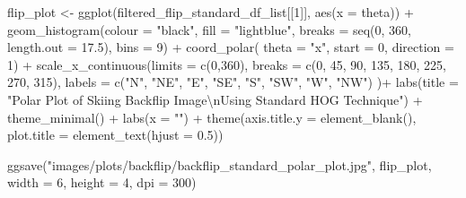 \documentclass[
  letterpaper,
  DIV=11,
  numbers=noendperiod]{scrreprt}
\newenvironment{Shaded}{\begin{snugshade}}{\end{snugshade}}
\newcommand{\AttributeTok}[1]{\textcolor[rgb]{0.40,0.45,0.13}{#1}}
\newcommand{\DecValTok}[1]{\textcolor[rgb]{0.68,0.00,0.00}{#1}}
\newcommand{\FloatTok}[1]{\textcolor[rgb]{0.68,0.00,0.00}{#1}}
\newcommand{\FunctionTok}[1]{\textcolor[rgb]{0.28,0.35,0.67}{#1}}
\newcommand{\NormalTok}[1]{\textcolor[rgb]{0.00,0.23,0.31}{#1}}
\newcommand{\OtherTok}[1]{\textcolor[rgb]{0.00,0.23,0.31}{#1}}
\newcommand{\SpecialCharTok}[1]{\textcolor[rgb]{0.37,0.37,0.37}{#1}}
\newcommand{\StringTok}[1]{\textcolor[rgb]{0.13,0.47,0.30}{#1}}
\begin{document}
\begin{Shaded}
\begin{Highlighting}[]
\NormalTok{flip\_plot }\OtherTok{\textless{}{-}}
  \FunctionTok{ggplot}\NormalTok{(filtered\_flip\_standard\_df\_list[[}\DecValTok{1}\NormalTok{]],}
         \FunctionTok{aes}\NormalTok{(}\AttributeTok{x =}\NormalTok{ theta)) }\SpecialCharTok{+}
  \FunctionTok{geom\_histogram}\NormalTok{(}\AttributeTok{colour =} \StringTok{"black"}\NormalTok{,}
                 \AttributeTok{fill =} \StringTok{"lightblue"}\NormalTok{,}
                 \AttributeTok{breaks =} \FunctionTok{seq}\NormalTok{(}\DecValTok{0}\NormalTok{, }\DecValTok{360}\NormalTok{, }\AttributeTok{length.out =} \FloatTok{17.5}\NormalTok{),}
                 \AttributeTok{bins =} \DecValTok{9}\NormalTok{) }\SpecialCharTok{+}
  \FunctionTok{coord\_polar}\NormalTok{(}
    \AttributeTok{theta =} \StringTok{"x"}\NormalTok{,}
    \AttributeTok{start =} \DecValTok{0}\NormalTok{,}
    \AttributeTok{direction =} \DecValTok{1}\NormalTok{) }\SpecialCharTok{+}
  \FunctionTok{scale\_x\_continuous}\NormalTok{(}\AttributeTok{limits =} \FunctionTok{c}\NormalTok{(}\DecValTok{0}\NormalTok{,}\DecValTok{360}\NormalTok{),}
    \AttributeTok{breaks =} \FunctionTok{c}\NormalTok{(}\DecValTok{0}\NormalTok{, }\DecValTok{45}\NormalTok{, }\DecValTok{90}\NormalTok{, }\DecValTok{135}\NormalTok{, }\DecValTok{180}\NormalTok{, }\DecValTok{225}\NormalTok{, }\DecValTok{270}\NormalTok{, }\DecValTok{315}\NormalTok{),}
    \AttributeTok{labels =} \FunctionTok{c}\NormalTok{(}\StringTok{"N"}\NormalTok{, }\StringTok{"NE"}\NormalTok{, }\StringTok{"E"}\NormalTok{, }\StringTok{"SE"}\NormalTok{, }\StringTok{"S"}\NormalTok{, }\StringTok{"SW"}\NormalTok{, }\StringTok{"W"}\NormalTok{, }\StringTok{"NW"}\NormalTok{)}
\NormalTok{  )}\SpecialCharTok{+}
  \FunctionTok{labs}\NormalTok{(}\AttributeTok{title =} \StringTok{"Polar Plot of Skiing Backflip Image}\SpecialCharTok{\textbackslash{}n}\StringTok{Using Standard HOG Technique"}\NormalTok{) }\SpecialCharTok{+}
  \FunctionTok{theme\_minimal}\NormalTok{() }\SpecialCharTok{+}
  \FunctionTok{labs}\NormalTok{(}\AttributeTok{x =} \StringTok{""}\NormalTok{) }\SpecialCharTok{+}
  \FunctionTok{theme}\NormalTok{(}\AttributeTok{axis.title.y =} \FunctionTok{element\_blank}\NormalTok{(),}
        \AttributeTok{plot.title =} \FunctionTok{element\_text}\NormalTok{(}\AttributeTok{hjust =} \FloatTok{0.5}\NormalTok{))}

\FunctionTok{ggsave}\NormalTok{(}\StringTok{"images/plots/backflip/backflip\_standard\_polar\_plot.jpg"}\NormalTok{, flip\_plot, }\AttributeTok{width =} \DecValTok{6}\NormalTok{, }\AttributeTok{height =} \DecValTok{4}\NormalTok{, }\AttributeTok{dpi =} \DecValTok{300}\NormalTok{)}
\end{Highlighting}
\end{Shaded}
\end{document}
